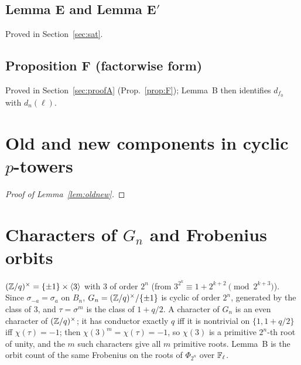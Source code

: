 \documentclass[11pt]{amsart}
\theoremstyle{remark}\newtheorem{remark}[theorem]{Remark}
\theoremstyle{definition}\newtheorem{definition}[theorem]{Definition}
\theoremstyle{definition}\newtheorem{algorithm}[theorem]{Algorithm}
\providecommand{\proofsdir}{../../proofs} %
\begin{document}
\subsection*{Lemma E and Lemma E$'$}
Proved in Section~\ref{sec:sat}.
\subsection*{Proposition F (factorwise form)}
Proved in Section~\ref{sec:proofA} (Prop.~\ref{prop:F}); Lemma~B then identifies $d_{f_0}$ with $d_n(\ell)$.

\section{Old and new components in cyclic $p$-towers}\label{app:B}
\begin{proof}[Proof of Lemma~\ref{lem:oldnew}]

\end{proof}

\section{Characters of $G_n$ and Frobenius orbits}\label{app:C}
$(\mathbb{Z}/q)^\times=\{\pm1\}\times\langle3\rangle$ with $3$ of order $2^n$ (from $3^{2^k}\equiv1+2^{k+2}\pmod{2^{k+3}}$). Since $\sigma_{-a}=\sigma_a$ on $B_n$, $G_n=(\mathbb{Z}/q)^\times/\{\pm1\}$ is cyclic of order $2^n$, generated by the class of $3$, and $\tau=\sigma^{m}$ is the class of $1+q/2$. A character of $G_n$ is an even character of $(\mathbb{Z}/q)^\times$; it has conductor exactly $q$ iff it is nontrivial on $\{1,1+q/2\}$ iff $\chi(\tau)=-1$; then $\chi(3)^m=\chi(\tau)=-1$, so $\chi(3)$ is a primitive $2^n$-th root of unity, and the $m$ such characters give all $m$ primitive roots. Lemma~B is the orbit count of the same Frobenius on the roots of $\Phi_{2^n}$ over $\mathbb{F}_\ell$.
\end{document}
